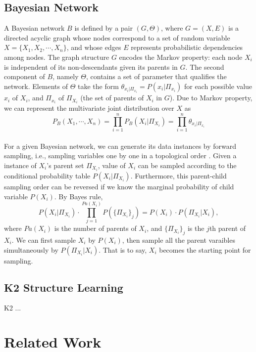 \subsection{Bayesian Network}
\label{BN_basic}
A Bayesian network $B$ is defined by a pair $(G,\Theta)$, where $G = (X,E)$ is a directed acyclic graph whose nodes correspond to a set of random variable $X = \{  X_1, X_2, \cdots, X_n \}$, and whose edges $E$ represents probabilistic dependencies among nodes. The graph structure $G$ encodes the Markov property: each node $X_i$ is independent of its non-descendants given its parents in $G$. The second component of $B$, namely $\Theta$, contains a set of parameter that qualifies the network. Elements of $\Theta$ take the form $\theta_{x_i|\Pi_{x_i}} = P(x_i|\Pi_{x_i})$ for each possible value $x_i$ of $X_i$, and $\Pi_{x_i}$ of $\Pi_{X_i}$ (the set of parents of $X_i$ in $G$). Due to Markov property, we can represent the multivariate joint distribution over $X$ as
\begin{equation*}
P_B (X_1 , \cdots, X_n) = \prod_{i=1}^{n} P_B (X_i | \Pi_{X_i}) = \prod_{i=1}^{n} \theta_{x_i|\Pi_{x_i}}
\end{equation*}\\
For a given Bayesian network, we can generate its data instances by forward sampling, i.e., sampling variables one by one in a topological order \citep[see][chap.~22]{algo_2009}. Given a instance of $X_i$'s parent set $\Pi_{X_i}$, value of $X_i$ can be sampled according to the conditional probability table $P(X_i | \Pi_{X_i})$. Furthermore, this parent-child sampling order can be reversed if we know the marginal probability of child variable $P(X_i)$. By Bayes rule,
\begin{equation*}
P(X_i | \Pi_{X_i}) \cdot \prod_{j = 1}^{ Pa( X_i)} P( \{ \Pi_{X_i} \}_j) = P(X_i) \cdot P(\Pi_{X_i} | X_i),
\end{equation*}
where $Pa( X_i)$ is the number of parents of $X_i$, and $\{ \Pi_{X_i} \}_j$ is the $j$th parent of $X_i$. We can first sample $X_i$ by $P(X_i)$, then sample all the parent varaibles simultaneously by $P(\Pi_{X_i} | X_i)$. That is to say, $X_i$ becomes the starting point for sampling.

\subsection{K2 Structure Learning}
\label{intro_K2}
K2 ...

\section{Related Work}
\label{relat_work}
